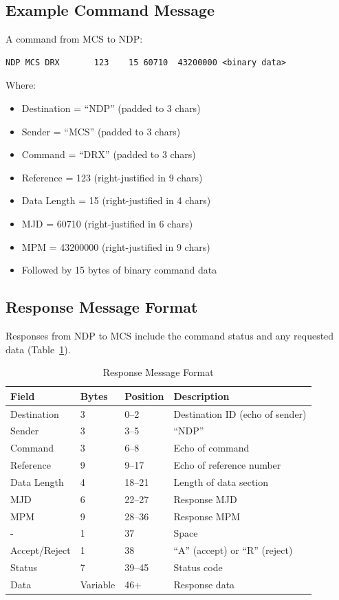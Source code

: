 \subsection{Example Command Message}

A  command from MCS to NDP:
\begin{verbatim}
NDP MCS DRX       123    15 60710  43200000 <binary data>
\end{verbatim}

Where:
\begin{itemize}
    \item Destination = ``NDP'' (padded to 3 chars)
    \item Sender = ``MCS'' (padded to 3 chars)
    \item Command = ``DRX'' (padded to 3 chars)
    \item Reference = 123 (right-justified in 9 chars)
    \item Data Length = 15 (right-justified in 4 chars)
    \item MJD = 60710 (right-justified in 6 chars)
    \item MPM = 43200000 (right-justified in 9 chars)
    \item Followed by 15 bytes of binary command data
\end{itemize}

\subsection{Response Message Format}

Responses from NDP to MCS include the command status and any requested data (Table~\ref{tab:resp-format}).

\begin{table}[htbp]
    \centering
    \caption{Response Message Format}
    \label{tab:resp-format}
    \begin{tabular}{llll}
        \toprule
        \textbf{Field} & \textbf{Bytes} & \textbf{Position} & \textbf{Description} \\
        \midrule
        Destination & 3 & 0--2 & Destination ID (echo of sender) \\
        Sender & 3 & 3--5 & ``NDP'' \\
        Command & 3 & 6--8 & Echo of command \\
        Reference & 9 & 9--17 & Echo of reference number \\
        Data Length & 4 & 18--21 & Length of data section \\
        MJD & 6 & 22--27 & Response MJD \\
        MPM & 9 & 28--36 & Response MPM \\
        - & 1 & 37 & Space \\
        Accept/Reject & 1 & 38 & ``A'' (accept) or ``R'' (reject) \\
        Status & 7 & 39--45 & Status code \\
        Data & Variable & 46+ & Response data \\
        \bottomrule
    \end{tabular}
\end{table}

